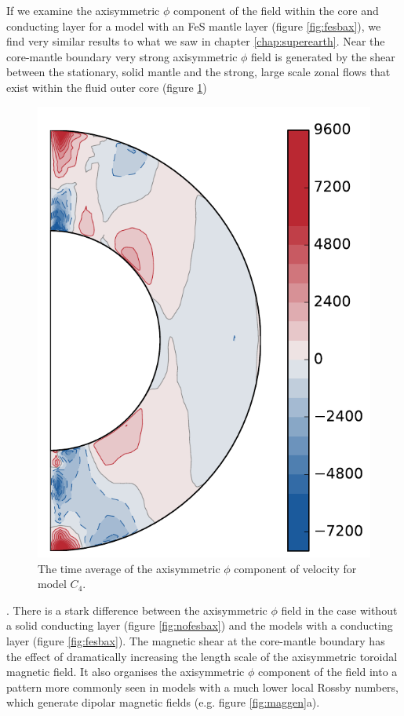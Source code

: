 If we examine the axisymmetric $\phi$ component of the field within the core and conducting layer for a model with an FeS mantle layer (figure \ref{fig:fesbax}), we find very similar results to what we saw in chapter \ref{chap:superearth}. Near the core-mantle boundary very strong axisymmetric $\phi$ field is generated by the shear between the stationary, solid mantle and the strong, large scale zonal flows that exist within the fluid outer core (figure \ref{fig:fesutor})
\begin{figure}
	\centering
        \includegraphics[width=.4\textwidth]{Chapter5/Figures/utor11_004_1500-1630.pdf} 
        \caption{The time average of the axisymmetric $\phi$ component of velocity for model $C_4$.}
        \label{fig:fesutor}
\end{figure}
. There is a stark difference between the axisymmetric $\phi$ field in the case without a solid conducting layer (figure \ref{fig:nofesbax}) and the models with a conducting layer (figure \ref{fig:fesbax}). The magnetic shear at the core-mantle boundary has the effect of dramatically increasing the length scale of the axisymmetric toroidal magnetic field. It also organises the axisymmetric $\phi$ component of the field into a pattern more commonly seen in models with a much lower local Rossby numbers, which generate dipolar magnetic fields (e.g. figure \ref{fig:maggen}a).

